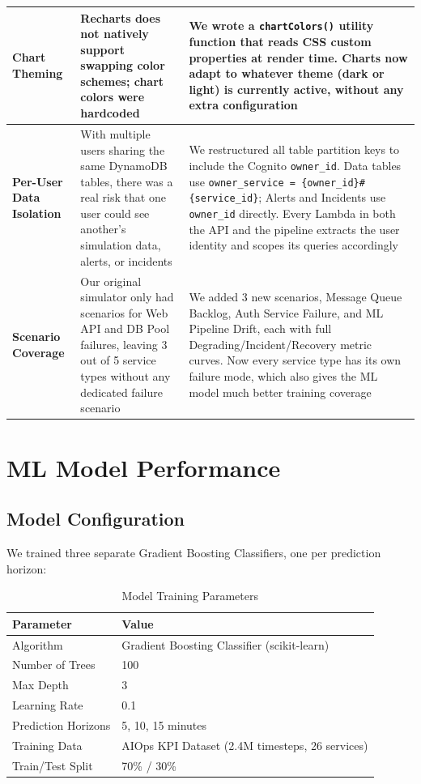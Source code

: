 \documentclass[11pt,a4paper]{article}
\begin{document}
\begin{xltabular}{\textwidth}{>{\bfseries}p{3.5cm}XX}
\midrule
Chart Theming & Recharts does not natively support swapping color schemes; chart colors were hardcoded & We wrote a \texttt{chartColors()} utility function that reads CSS custom properties at render time. Charts now adapt to whatever theme (dark or light) is currently active, without any extra configuration \\
\midrule
Per-User Data Isolation & With multiple users sharing the same DynamoDB tables, there was a real risk that one user could see another's simulation data, alerts, or incidents & We restructured all table partition keys to include the Cognito \texttt{owner\_id}. Data tables use \texttt{owner\_service = \{owner\_id\}\#\{service\_id\}}; Alerts and Incidents use \texttt{owner\_id} directly. Every Lambda in both the API and the pipeline extracts the user identity and scopes its queries accordingly \\
\midrule
Scenario Coverage & Our original simulator only had scenarios for Web API and DB Pool failures, leaving 3 out of 5 service types without any dedicated failure scenario & We added 3 new scenarios, Message Queue Backlog, Auth Service Failure, and ML Pipeline Drift, each with full Degrading/Incident/Recovery metric curves. Now every service type has its own failure mode, which also gives the ML model much better training coverage \\
\end{xltabular}

\section{ML Model Performance}

\subsection{Model Configuration}

We trained three separate Gradient Boosting Classifiers, one per prediction horizon:

\begin{table}[H]
\centering
\begin{tabular}{ll}
\toprule
\textbf{Parameter} & \textbf{Value} \\
\midrule
Algorithm & Gradient Boosting Classifier (scikit-learn) \\
Number of Trees & 100 \\
Max Depth & 3 \\
Learning Rate & 0.1 \\
Prediction Horizons & 5, 10, 15 minutes \\
Training Data & AIOps KPI Dataset (2.4M timesteps, 26 services) \\
Train/Test Split & 70\% / 30\% \\
\bottomrule
\end{tabular}
\caption{Model Training Parameters}
\label{tab:model-params}
\end{table}
\end{document}
